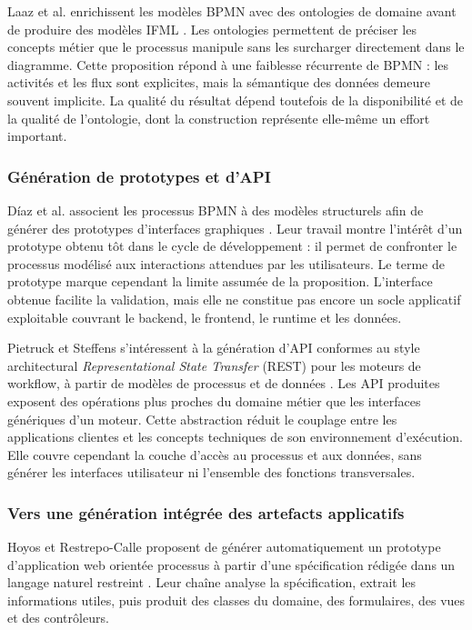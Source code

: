 Laaz et al. enrichissent les modèles BPMN avec des ontologies de domaine avant
de produire des modèles IFML \cite{laaz2020}. Les ontologies permettent de
préciser les concepts métier que le processus manipule sans les surcharger
directement dans le diagramme. Cette proposition répond à une faiblesse
récurrente de BPMN : les activités et les flux sont explicites, mais la
sémantique des données demeure souvent implicite. La qualité du résultat
dépend toutefois de la disponibilité et de la qualité de l'ontologie, dont la
construction représente elle-même un effort important.

\subsubsection{Génération de prototypes et d'API}

Díaz et al. associent les processus BPMN à des modèles structurels afin de
générer des prototypes d'interfaces graphiques \cite{diaz2018}. Leur travail
montre l'intérêt d'un prototype obtenu tôt dans le cycle de développement : il
permet de confronter le processus modélisé aux interactions attendues par les
utilisateurs. Le terme de prototype marque cependant la limite assumée de la
proposition. L'interface obtenue facilite la validation, mais elle ne constitue
pas encore un socle applicatif exploitable couvrant le backend, le frontend, le
runtime et les données.

Pietruck et Steffens s'intéressent à la génération d'API conformes au style
architectural \textit{Representational State Transfer} (REST) pour les moteurs
de workflow, à partir de modèles de processus et de données
\cite{pietruck2020}. Les API produites exposent des opérations plus proches du
domaine métier que les interfaces génériques d'un moteur. Cette abstraction
réduit le couplage entre les applications clientes et les concepts techniques
de son environnement d'exécution. Elle couvre cependant la couche d'accès au
processus et aux données, sans générer les interfaces utilisateur ni
l'ensemble des fonctions transversales.

\subsubsection{Vers une génération intégrée des artefacts applicatifs}

Hoyos et Restrepo-Calle proposent de générer automatiquement un prototype
d'application web orientée processus à partir d'une spécification rédigée dans
un langage naturel restreint \cite{hoyos2017}. Leur chaîne analyse la
spécification, extrait les informations utiles, puis produit des classes du
domaine, des formulaires, des vues et des contrôleurs.

